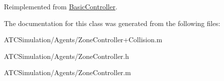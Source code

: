 \-Reimplemented from \hyperlink{interface_basic_controller_a2a7181ab5a5de771efb559fd110b63b0}{\-Basic\-Controller}.



\-The documentation for this class was generated from the following files\-:\begin{DoxyCompactItemize}
\item 
\-A\-T\-C\-Simulation/\-Agents/\-Zone\-Controller+\-Collision.\-m\item 
\-A\-T\-C\-Simulation/\-Agents/\-Zone\-Controller.\-h\item 
\-A\-T\-C\-Simulation/\-Agents/\-Zone\-Controller.\-m\end{DoxyCompactItemize}
